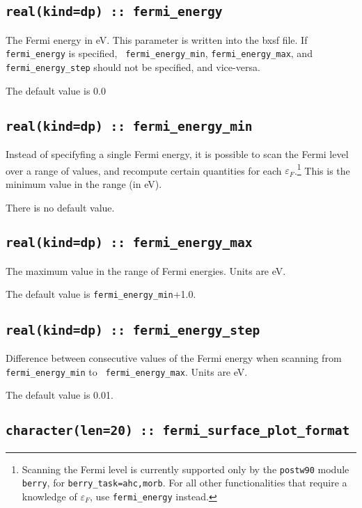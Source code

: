 \subsection[fermi\_energy]{\tt real(kind=dp) :: fermi\_energy}
The Fermi energy in eV. This parameter is written into the bxsf file.
If {\tt fermi\_energy} is specified, {\tt
    fermi\_energy\_min}, {\tt fermi\_energy\_max}, and {\tt
    fermi\_energy\_step} should not be specified, and vice-versa.


The default value is 0.0


\subsection[fermi\_energy]{\tt real(kind=dp) :: fermi\_energy\_min}
Instead of specifyfing a single Fermi energy, it is possible to scan
the Fermi level over a range of values, and recompute certain
quantities for each $\varepsilon_F$.\footnote{Scanning the Fermi level
  is currently supported only by the {\tt postw90} module {\tt berry},
  for {\tt berry\_task=ahc,morb}. For all other functionalities that
  require a knowledge of $\varepsilon_F$, use {\tt fermi\_energy}
  instead.}  This is the minimum value in the range (in eV).

There is no default value.

\subsection[fermi\_energy]{\tt real(kind=dp) :: fermi\_energy\_max}
The maximum value in the range of Fermi energies. Units are eV.

The default value is {\tt fermi\_energy\_min}+1.0.

\subsection[fermi\_energy]{\tt real(kind=dp) :: fermi\_energy\_step}
Difference between consecutive values of the Fermi energy when
scanning from {\tt fermi\_energy\_min} to {\tt
  fermi\_energy\_max}. Units are eV.

The default value is 0.01.


\subsection[fermi\_surface\_plot\_format]{\tt character(len=20) ::
  fermi\_surface\_plot\_format} 

